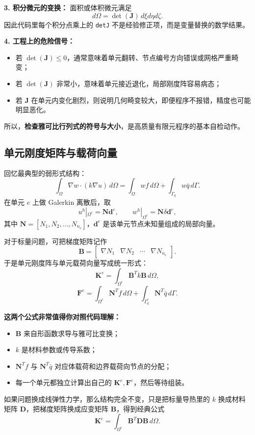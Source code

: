 \documentclass[11pt, a4paper, UTF8]{ctexart}
\begin{document}
\textbf{3. 积分微元的变换：}
面积或体积微元满足
\[
d\Omega = \det(\bm{J}) \, d\xi d\eta d\zeta.
\]
因此代码里每个积分点乘上的 \texttt{detJ} 不是经验修正项，而是变量替换的数学结果。

\textbf{4. 工程上的危险信号：}
\begin{itemize}
    \item 若 $\det(\bm{J}) \le 0$，通常意味着单元翻转、节点编号方向错误或网格严重畸变；
    \item 若 $\det(\bm{J})$ 非常小，意味着单元接近退化，局部刚度阵容易病态；
    \item 若 $\bm{J}$ 在单元内变化剧烈，则说明几何畸变较大，即便程序不报错，精度也可能明显恶化。
\end{itemize}
所以，\textbf{检查雅可比行列式的符号与大小}，是高质量有限元程序的基本自检动作。

\subsection{单元刚度矩阵与载荷向量}
回忆最典型的弱形式结构：
\[
\int_{\Omega} \nabla w \cdot (k \nabla u)\, d\Omega
=
\int_{\Omega} w f\, d\Omega + \int_{\Gamma_q} w \bar{q}\, d\Gamma.
\]
在单元 $e$ 上做 Galerkin 离散后，取
\[
u^h|_{\Omega^e} = \bm{N}\bm{d}^e, \qquad
w^h|_{\Omega^e} = \bm{N}\delta \bm{d}^e,
\]
其中 $\bm{N}=[N_1, N_2, \dots, N_{n_e}]$，$\bm{d}^e$ 是该单元节点未知量组成的局部向量。

对于标量问题，可把梯度矩阵记作
\[
\bm{B} =
\begin{bmatrix}
\nabla N_1 & \nabla N_2 & \cdots & \nabla N_{n_e}
\end{bmatrix}.
\]
于是单元刚度阵与单元载荷向量写成统一形式：
\[
\bm{K}^e = \int_{\Omega^e} \bm{B}^T k \bm{B}\, d\Omega,
\]
\[
\bm{F}^e = \int_{\Omega^e} \bm{N}^T f\, d\Omega + \int_{\Gamma_q^e} \bm{N}^T \bar{q}\, d\Gamma.
\]

\textbf{这两个公式非常值得你对照代码理解：}
\begin{itemize}
    \item $\bm{B}$ 来自形函数求导与雅可比变换；
    \item $k$ 是材料参数或传导系数；
    \item $\bm{N}^T f$ 与 $\bm{N}^T \bar{q}$ 对应体载荷和边界载荷向节点的分配；
    \item 每一个单元都独立计算出自己的 $\bm{K}^e,\bm{F}^e$，然后等待组装。
\end{itemize}

如果问题换成线弹性力学，那么结构完全不变，只是把标量导热里的 $k$ 换成材料矩阵 $\bm{D}$，把梯度矩阵换成应变矩阵 $\bm{B}$，得到经典公式
\[
\bm{K}^e = \int_{\Omega^e} \bm{B}^T \bm{D}\bm{B}\, d\Omega.
\]
\end{document}
